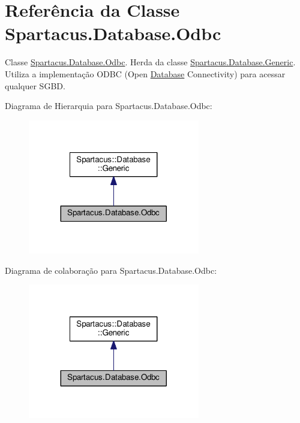 \hypertarget{classSpartacus_1_1Database_1_1Odbc}{\section{Referência da Classe Spartacus.\+Database.\+Odbc}
\label{classSpartacus_1_1Database_1_1Odbc}
}


Classe \hyperlink{classSpartacus_1_1Database_1_1Odbc}{Spartacus.\+Database.\+Odbc}. Herda da classe \hyperlink{classSpartacus_1_1Database_1_1Generic}{Spartacus.\+Database.\+Generic}. Utiliza a implementação O\+D\+B\+C (Open \hyperlink{namespaceSpartacus_1_1Database}{Database} Connectivity) para acessar qualquer S\+G\+B\+D.  




Diagrama de Hierarquia para Spartacus.\+Database.\+Odbc\+:
\nopagebreak
\begin{figure}[H]
\begin{center}
\leavevmode
\includegraphics[width=212pt]{classSpartacus_1_1Database_1_1Odbc__inherit__graph}
\end{center}
\end{figure}


Diagrama de colaboração para Spartacus.\+Database.\+Odbc\+:
\nopagebreak
\begin{figure}[H]
\begin{center}
\leavevmode
\includegraphics[width=212pt]{classSpartacus_1_1Database_1_1Odbc__coll__graph}
\end{center}
\end{figure}
